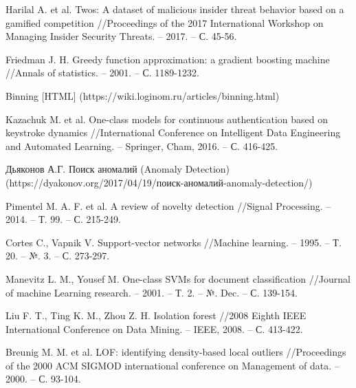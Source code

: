 \documentclass[12pt]{article}
\begin{document}
\begin{thebibliography}{20}
        Harilal A. et al. Twos: A dataset of malicious insider threat behavior based on a gamified competition //Proceedings of the 2017 International Workshop on Managing Insider Security Threats. – 2017. – С. 45-56.

        Friedman J. H. Greedy function approximation: a gradient boosting machine //Annals of statistics. – 2001. – С. 1189-1232.

        Binning [HTML] (https://wiki.loginom.ru/articles/binning.html)

        Kazachuk M. et al. One-class models for continuous authentication based on keystroke dynamics //International Conference on Intelligent Data Engineering and Automated Learning. – Springer, Cham, 2016. – С. 416-425.

        Дьяконов А.Г. Поиск аномалий (Anomaly Detection) (https://dyakonov.org/2017/04/19/поиск-аномалий-anomaly-detection/)

        Pimentel M. A. F. et al. A review of novelty detection //Signal Processing. – 2014. – Т. 99. – С. 215-249.

        Cortes C., Vapnik V. Support-vector networks //Machine learning. – 1995. – Т. 20. – №. 3. – С. 273-297.

        Manevitz L. M., Yousef M. One-class SVMs for document classification //Journal of machine Learning research. – 2001. – Т. 2. – №. Dec. – С. 139-154.

        Liu F. T., Ting K. M., Zhou Z. H. Isolation forest //2008 Eighth IEEE International Conference on Data Mining. – IEEE, 2008. – С. 413-422.



        Breunig M. M. et al. LOF: identifying density-based local outliers //Proceedings of the 2000 ACM SIGMOD international conference on Management of data. – 2000. – С. 93-104.


\end{thebibliography}
\end{document}
